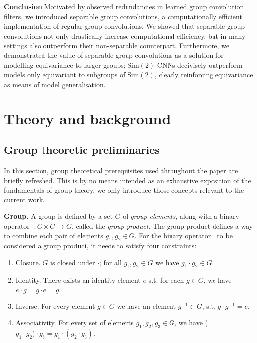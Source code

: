 \documentclass[nohyperref]{article}
\theoremstyle{plain}
\theoremstyle{definition}
\theoremstyle{remark}
\begin{document}
\textbf{Conclusion} Motivated by observed redundancies in learned group convolution filters, we introduced separable group convolutions, a computationally efficient implementation of regular group convolutions. We showed that separable group convolutions not only drastically increase computational efficiency, but in many settings also outperform their non-separable counterpart. Furthermore, we demonstrated the value of separable group convolutions as a solution for modelling equivariance to larger groups; $\mathrm{Sim(2)}$-CNNs decivisely outperform models only equivariant to subgroups of $\mathrm{Sim(2)}$, clearly reinforcing equivariance as means of model generalisation.





\newpage
\appendix
\onecolumn
\section{Theory and background}
\subsection{Group theoretic preliminaries}
\label{app:grouptheory}
In this section, group theoretical prerequisites used throughout the paper are briefly refreshed. This is by no means intended as an exhaustive exposition of the fundamentals of group theory, we only introduce those concepts relevant to the current work.

\textbf{Group.} A group is defined by a set $G$ of \textit{group elements}, along with a binary operator $\cdot:G \times G \rightarrow G$, called the \textit{group product}. The group product defines a way to combine each pair of elements $g_1,g_2 \in G$. For the binary operator $\cdot$ to be considered a group product, it needs to satisfy four constraints:
\begin{enumerate}
    \item Closure. $G$ is closed under $\cdot$; for all $g_1, g_2 \in G$ we have $g_1 \cdot g_2 \in G$.
    \item Identity. There exists an identity element $e$ s.t. for each $g \in G$, we have $e \cdot g = g \cdot e = g$.
    \item Inverse. For every element $g \in G$ we have an element $g^{-1} \in G$, s.t. $g \cdot g^{-1} = e$.
    \item Associativity. For every set of elements $g_1, g_2, g_3 \in G$, we have ($g_1 \cdot g_2) \cdot g_3 = g_1 \cdot (g_2 \cdot g_3) $.
\end{enumerate}
\end{document}
